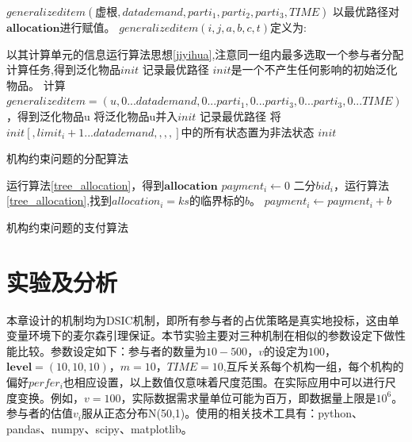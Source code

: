 \documentclass[promaster]{thesis-uestc}
\begin{document}
\begin{algorithm}[h]
    $generalizeditem(\text{虚根},datademand,parti_1,parti_2,parti_3,TIME)$\;
    以最优路径对$\mathbf{allocation}$进行赋值。\;
    \;
    $generalizeditem(i,j,a,b,c,t)$定义为:\;
    
    {
        以其计算单元的信息运行算法思想\ref{jiyihua},注意同一组内最多选取一个参与者分配计算任务,得到泛化物品$init$\;
        记录最优路径\;
    }{
        $init$是一个不产生任何影响的初始泛化物品。
    }
    {
        计算$generalizeditem=(u,0...datademand,0...parti_1,0...parti_3,0...parti_3,0...TIME)$，得到泛化物品u\;
        将泛化物品u并入$init$\;
        记录最优路径\;
    }
    将$init[,limit_i+1...datademand,,,,]$中的所有状态置为非法状态\;
    \Return $init$\;
\caption{机构约束问题的分配算法}
\label{tree_allocation}
\end{algorithm}

\begin{algorithm}[h]
    运行算法\ref{tree_allocation}，得到$\mathbf{allocation}$\;
    {
        $payment_i \leftarrow 0$\;
        {
            二分$bid_i$，运行算法\ref{tree_allocation},找到$allocation_i = ks$的临界标的$b$。
            $payment_i \leftarrow payment_i + b$
        }
    }
\caption{机构约束问题的支付算法}
\label{tree_zhifu}
\end{algorithm}

\FloatBarrier

\section{实验及分析}
本章设计的机制均为DSIC机制，即所有参与者的占优策略是真实地投标，这由单变量环境下的麦尔森引理保证。本节实验主要对三种机制在相似的参数设定下做性能比较。参数设定如下：参与者的数量为$10-500$，$v$的设定为$100$，$\mathbf{level}=(10,10,10)$，$m=10$，$TIME=10$,互斥关系每个机构一组，每个机构的偏好$perfer_i$也相应设置，以上数值仅意味着尺度范围。在实际应用中可以进行尺度变换。例如，$v=100$，实际数据需求量单位可能为百万，即数据量上限是$10^6$。参与者的估值$v_i$服从正态分布N(50,1)。使用的相关技术工具有：python、pandas、numpy、scipy、matplotlib。
\end{document}
